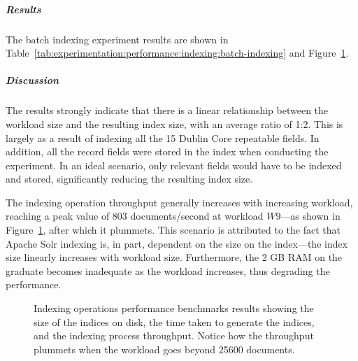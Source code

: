 \subparagraph{Results}

The batch indexing experiment results are shown in Table~\ref{tab:experimentation:performance:indexing:batch-indexing} and Figure~\ref{fig:experimentation:performance:indexing:index-throughput}.

\subparagraph{Discussion}

The results strongly indicate that there is a linear relationship between the workload size and the resulting index size, with an average ratio of 1:2. This is largely as a result of indexing all the \num{15} Dublin Core repeatable fields. In addition, all the record fields were stored in the index when conducting the experiment. In an ideal scenario, only relevant fields would have to be indexed and stored, significantly reducing the resulting index size.

The indexing operation throughput generally increases with increasing workload, reaching a peak value of \num{803} documents/second at workload $W9$---as shown in Figure~\ref{fig:experimentation:performance:indexing:index-throughput}, after which it plummets. This scenario is attributed to the fact that Apache Solr indexing is, in part, dependent on the size on the index---the index size linearly increases with workload size. Furthermore, the 2 GB RAM on the graduate becomes inadequate as the workload increases, thus degrading the performance.

% 
\begin{comment}
\begin{figure}
 \centering
 \framebox[\textwidth]{%

 }
 \caption[Index size relative to collection size]{Linear relationship between index\index{Index} sizes on disk and the collection corpus workload\index{Workload} sizes.}
 \label{fig:experimentation:performance:indexing:index-size}
\end{figure}
\end{comment}

\begin{figure}
 \centering
 \framebox[\textwidth]{%

 }
 \caption[Baseline performance benchmarks for batch indexing]{Indexing operations performance benchmarks results showing the size of the indices on disk, the time taken to generate the indices, and the indexing process throughput. Notice how the throughput plummets when the workload goes beyond \num{25600} documents.}
 \label{fig:experimentation:performance:indexing:index-throughput}
\end{figure}

